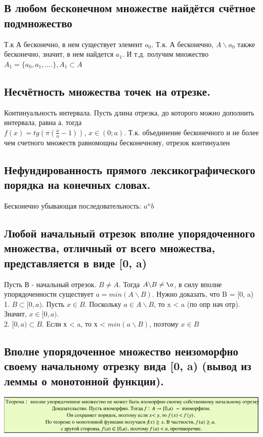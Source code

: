 \subsection{В любом бесконечном множестве найдётся счётное подмножество}
Т.к А бесконечно, в нем существует элемент $a_0$. Т.к. А бесконечно, $A\backslash{a_0}$ также бесконечно, значит, в нем найдется $a_1$. И т.д. получим множество $A_1 = \{a_0, a_1,....\}, A_1 \subset A$

\subsection{Несчётность множества точек на отрезке.}
Континуальность интервала. Пусть длина отрезка, до которого можно дополнить интервала, равна а. тогда\\
$f(x) = tg(\pi(\frac{x}{a} - 1))$, $x \in (0;a)$. Т.к. объединение бесконечного и не более чем счетного множеств равномощны бесконечному, отрезок континуален

\subsection{Нефундированность прямого лексикографического порядка на конечных словах.}
Бесконечно убывающая последовательность: $a^nb$

\subsection{Любой начальный отрезок вполне упорядоченного множества, отличный от всего
множества, представляется в виде [0, a)}
Пусть В - начальный отрезок. $B \neq A$. Тогда $A \backslash B \neq \o$, в силу вполне упорядоченности существует $a = min(A \backslash B)$. Нужно доказать, что B = [0, a)
\\
1. $B \subset [0,a)$. Пусть $x \in B$. Поскольку $a \in A \backslash B$, то x < a (по опр нач отр). Значит, $x \in [0,a)$.\\
2. $[0,a) \subset B$. Если х < a, то х < $min(a \backslash B)$, поэтому $x \in B$

\subsection{Вполне упорядоченное множество неизоморфно своему начальному отрезку вида
[0, a) (вывод из леммы о монотонной функции).}
\begin{center}
    \includegraphics[width = 17cm]{images/2 (определения)_m211.PNG}
\end{center}

